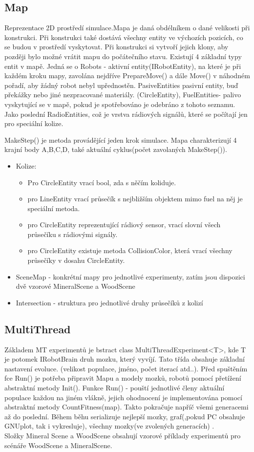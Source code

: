 \documentclass[12pt, oneside]{article}
\begin{document}
\subsection{Map} 
Reprezentace 2D prostředí simulace.Mapa je daná obdélníkem o dané velikosti při konstrukci. Při konstrukci také dostává všechny entity ve výchozích pozicích, co se budou v prostředí vyskytovat. Při konstrukci si vytvoří jejich klony, aby později bylo možné vrátit mapu do  počátečního stavu. Existují 4 základní typy entit v mapě. Jedná se o  Robots - aktivní entity(IRobotEntity), na které je při každém kroku mapy, zavolána nejdříve PrepareMove() a dále Move() v náhodném pořadí, aby žádný robot nebyl upřednostěn. PasiveEntities pasivní entity, buď překážky nebo jiné nezpracované materiály. (CircleEntity), FuelEntities- palivo vyskytující se v mapě, pokud je spotřebováno je odebráno z tohoto seznamu. Jako poslední RadioEntities, což je vrstva rádiových signálů, které se počítají jen pro speciální kolize. \par 
MakeStep()  je metoda provádějící jeden krok simulace. 
Mapa charakterizují 4 krajní body A,B,C,D, také aktuální cyklus(počet zavolaných MakeStep()).
\begin{itemize}
\item Kolize: 
\begin{itemize}
\item Pro CircleEntity vrací bool, zda s něčím koliduje. 
\item pro LineEntity vrací průsečík s nejbližším objektem mimo fuel na něj  je speciální metoda. 
\item pro CircleEntity reprezentující rádiový sensor, vrací slovní všech průsečíku s rádiovými  signály. 
\item pro  CircleEntity existuje metoda CollisionColor, která vrací všechny průsečíky v dosahu CircleEntity.
\end{itemize} 
\item SceneMap - konkrétní mapy pro jednotlivé experimenty, zatím jsou dispozici  dvě vzorové MineralScene a WoodScene
\item Intersection - struktura pro  jednotlivé druhy průsečíků z kolizí
\end{itemize} 
\newpage
\subsection{MultiThread}
Základem MT experimentů je bstract class MultiThreadExperiment<T>, kde T je potomek IRobotBrain druh mozku, který vyvíjí. Tato třída obsahuje základní nastavení evoluce. (velikost populace, jméno, počet iterací atd..). Před spuštěním fce Run() je potřeba připravit Mapu a modely mozků, robotů pomocí přetížení abstraktní metody Init(). Funkce Run() - pouští jednotlivé členy aktuální populace každou na jiném vlákně, jejich ohodnocení je implementována pomocí abstraktní metody CountFitness(map). Takto pokračuje napříč všemi generacemi až do poslední. Během běhu serializuje nejlepší mozky, graf(,pokud PC obsahuje GNUplot, tak i vykresluje), všechny mozky(ve zvolených generacích) . \\
Složky Mineral Scene a WoodScene obsahují vzorové příklady experimentů pro scénáře WoodScene a MineralScene.
\end{document}
